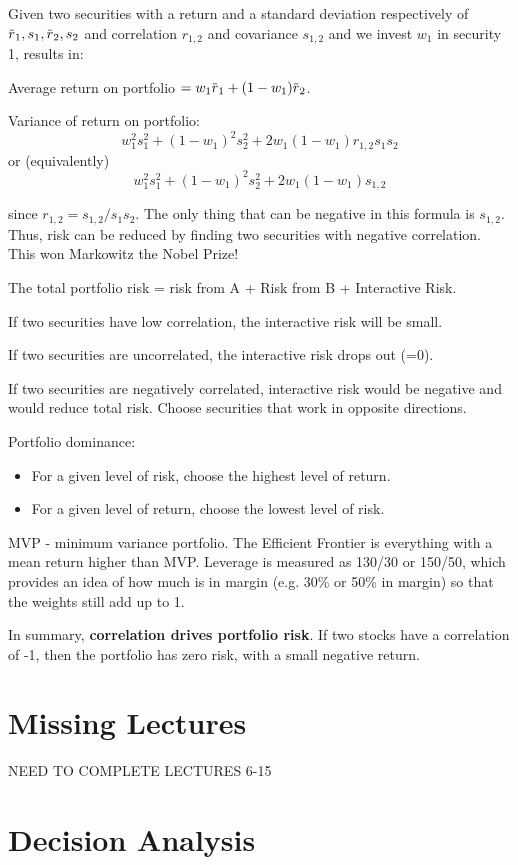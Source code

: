 \documentclass[11pt, oneside]{article}   	%
\newcommand{\overbar}[1]{\mkern 1.5mu\overline{\mkern-1.5mu#1\mkern-1.5mu}\mkern 1.5mu}
\begin{document}
Given two securities with a return and a standard deviation respectively of $\overbar{r}_1, s_1, \overbar{r}_2, s_2$ and correlation $r_{1,2}$ and covariance $s_{1,2}$ and we invest $w_1$ in security 1, results in:

Average return on portfolio $=w_1\overbar{r}_1 + (1-w_1)\overbar{r}_2$.

Variance of return on portfolio:
\[
w_1^2s_1^2 + (1-w_1)^2s_2^2 + 2w_1(1-w_1)r_{1,2}s_1s_2
\]
or (equivalently)
\[
w_1^2s_1^2 + (1-w_1)^2s_2^2 + 2w_1(1-w_1)s_{1,2}
\]

since $r_{1,2} = s_{1,2} / s_1s_2$. The only thing that can be negative in this formula is $s_{1,2}$. Thus, risk can be reduced by finding two securities with negative correlation. This won Markowitz the Nobel Prize!

The total portfolio risk = risk from A + Risk from B + Interactive Risk.

If two securities have low correlation, the interactive risk will be small.

If two securities are uncorrelated, the interactive risk drops out (=0).

If two securities are negatively correlated, interactive risk would be negative and would
reduce total risk. Choose securities that work in opposite directions.

Portfolio dominance:
\begin{itemize}
\item{For a given level of risk, choose the highest level of return.}

\item{For a given level of return, choose the lowest level of risk.}
\end{itemize}

MVP - minimum variance portfolio. The Efficient Frontier is everything with a mean return higher than MVP. Leverage is measured as 130/30 or 150/50, which provides an idea of how much is in margin (e.g. 30\% or 50\% in margin) so that the weights still add up to 1.

In summary, \textbf{correlation drives portfolio risk}. If two stocks have a correlation of -1, then the portfolio has zero risk, with a small negative return.

\section{Missing Lectures}
NEED TO COMPLETE LECTURES 6-15


\section{Decision Analysis}
\end{document}
